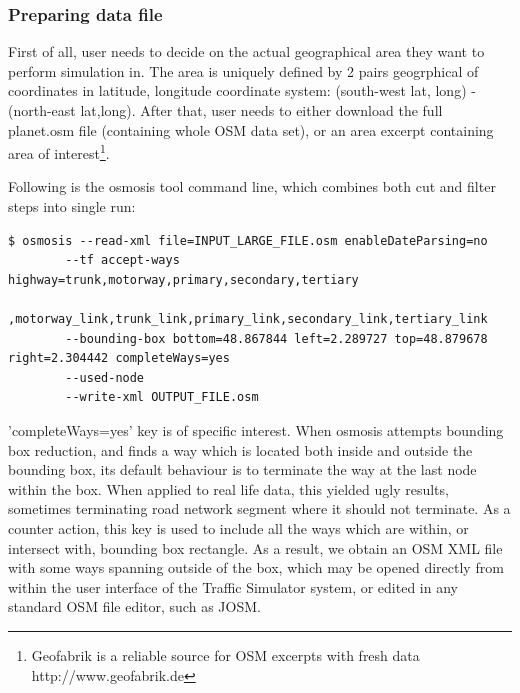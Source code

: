\subsubsection{Preparing data file}
First of all, user needs to decide on the actual geographical area they want to perform simulation in. The area is uniquely defined by 2 pairs geogrphical of coordinates in latitude, longitude coordinate system: (south-west lat, long) - (north-east lat,long). After that, user needs to either download the full planet.osm file (containing whole OSM data set), or an area excerpt containing area of interest\footnote{Geofabrik is a reliable source for OSM excerpts with fresh data http://www.geofabrik.de}.

Following is the osmosis tool command line, which combines both cut and filter steps into single run:
\begin{lstlisting}
$ osmosis --read-xml file=INPUT_LARGE_FILE.osm enableDateParsing=no
        --tf accept-ways highway=trunk,motorway,primary,secondary,tertiary
            ,motorway_link,trunk_link,primary_link,secondary_link,tertiary_link
        --bounding-box bottom=48.867844 left=2.289727 top=48.879678 right=2.304442 completeWays=yes
        --used-node
        --write-xml OUTPUT_FILE.osm
\end{lstlisting}
'completeWays=yes' key is of specific interest. When osmosis attempts bounding box reduction, and finds a way which is located both inside and outside the bounding box, its default behaviour is to terminate the way at the last node within the box. When applied to real life data, this yielded ugly results, sometimes terminating road network segment where it should not terminate. As a counter action, this key is used to include all the ways which are within, or intersect with, bounding box rectangle.  As a result, we obtain an OSM XML file with some ways spanning outside of the box, which may be opened directly from within the user interface of the Traffic Simulator system, or edited in any standard OSM file editor, such as JOSM.

